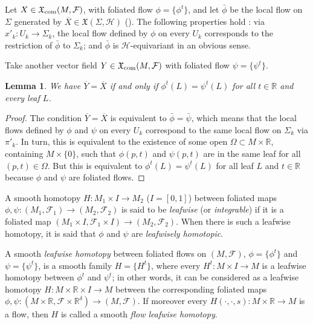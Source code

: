 \documentclass{memo-l}
\theoremstyle{plain}
\newtheorem{lem}[thm]{Lemma}
\theoremstyle{definition}
\theoremstyle{remark}
\newcommand{\R}{\mathbb{R}}
\newcommand{\FF}{\mathcal{F}}
\newcommand{\HH}{\mathcal{H}}
\newcommand{\fX}{\mathfrak{X}}
\newcommand{\fXcom}{\fX_{\text{\rm com}}}
\numberwithin{section}{chapter}
\numberwithin{equation}{section}%
\begin{document}
Let $X\in\fXcom(M,\FF)$, with foliated flow $\phi=\{\phi^t\}$, and let $\bar\phi$ be the local flow on $\Sigma$ generated by $\overline X\in\fX(\Sigma,\HH)$ (). The following properties hold \cite[Section~4.8]{AlvKordyLeichtnam2020}: via $x'_k:U_k\to\Sigma_k$, the local flow defined by $\phi$ on every $U_k$ corresponds to the restriction of $\bar\phi$ to $\Sigma_k$; and $\bar\phi$ is $\HH$-equivariant in an obvious sense.

Take another vector field $Y\in\fXcom(M,\FF)$ with foliated flow $\psi=\{\psi^t\}$.

\begin{lem}\label{l: overline Y = overline X <=> phi^t(L) = psi^t(L)}
We have $\overline Y=\overline X$ if and only if $\phi^t(L)=\psi^t(L)$ for all $t\in\R$ and every leaf $L$.
\end{lem}

\begin{proof}
The condition $\overline Y=\overline X$ is equivalent to $\bar\phi=\bar\psi$, which means that the local flows defined by $\phi$ and $\psi$ on every $U_k$ correspond to the same local flow on $\Sigma_k$ via $\pi'_k$. In turn, this is equivalent to the existence of some open $\Omega\subset M\times\R$, containing $M\times\{0\}$, such that $\phi(p,t)$ and $\psi(p,t)$ are in the same leaf for all $(p,t)\in\Omega$. But this is equivalent to $\phi^t(L)=\psi^t(L)$ for all leaf $L$ and $t\in\R$ because $\phi$ and $\psi$ are foliated flows.
\end{proof}

A smooth homotopy $H:M_1\times I\to M_2$ ($I=[0,1]$) between foliated maps $\phi,\psi:(M_1,\FF_1)\to(M_2,\FF_2)$ is said to be \emph{leafwise} (or \emph{integrable})  if it is a foliated map $(M_1\times I,\FF_1\times I)\to(M_2,\FF_2)$. When there is such a leafwise homotopy, it is said that $\phi$ and $\psi$ are \emph{leafwisely homotopic}.

A smooth \emph{leafwise homotopy} between foliated flows on $(M,\FF)$, $\phi=\{\phi^t\}$ and $\psi=\{\psi^t\}$, is a smooth family $H=\{H^t\}$, where every $H^t:M\times I\to M$ is a leafwise homotopy between $\phi^t$ and $\psi^t$; in other words, it can be considered as a leafwise homotopy $H:M\times\R\times I\to M$ between the corresponding foliated maps $\phi,\psi:(M\times\R,\FF\times\R^\delta)\to(M,\FF)$. If moreover every $H(\cdot,\cdot,s):M\times\R\to M$ is a flow, then $H$ is called a smooth \emph{flow leafwise homotopy}. 
\end{document}
